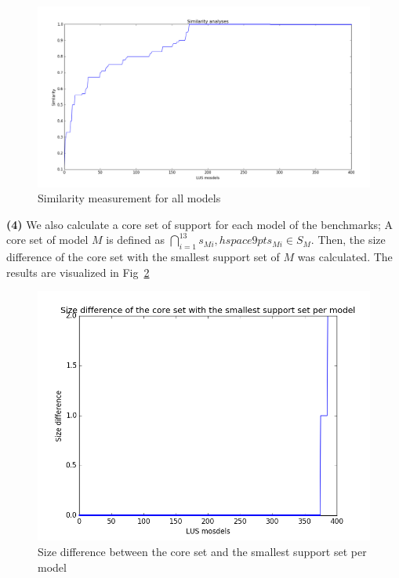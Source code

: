 \begin{figure}
  \centering
  \includegraphics[width=\textwidth]{figs/similarity.png}
  \caption{Similarity measurement for all models}\label{fig:sim}
\end{figure}


\noindent{}
 \vspace{9pt}

\textbf{(4)} We also calculate a core set of support for each model of the benchmarks; A core set of model $M$ is defined as
$\bigcap_{i=1}^{13} s_{Mi},   hspace{9pt} s_{Mi} \in S_M$. Then, the size difference of the core set with the smallest support set of $M$ was calculated. The results are visualized in Fig~\ref{fig:core}

\begin{figure}
  \centering
  \includegraphics[width=\textwidth]{figs/core.png}
  \caption{Size difference between the core set and the smallest support set per model}\label{fig:core}
\end{figure}


